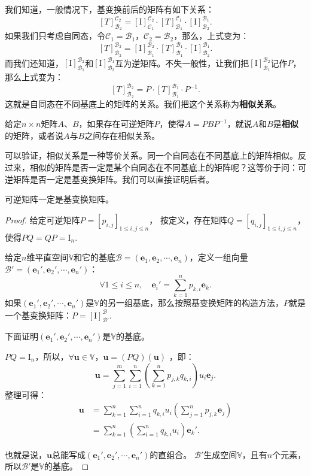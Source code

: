 \documentclass[12pt,UTF8]{ctexbook}
\begin{document}
我们知道，一般情况下，基变换前后的矩阵有如下关系：
$$[T]_{\mathcal{B}_2}^{\mathcal{C}_2} = [\mathrm{I}]_{\mathcal{C}_1}^{\mathcal{C}_2} \cdot [T]_{\mathcal{B}_1}^{\mathcal{C}_1} \cdot [\mathrm{I}]_{\mathcal{B}_2}^{\mathcal{B}_1} .$$
如果我们只考虑自同态，令$\mathcal{C}_1 = \mathcal{B}_1$，$\mathcal{C}_2 = \mathcal{B}_2$，那么，上式变为：
$$[T]_{\mathcal{B}_2}^{\mathcal{B}_2} = [\mathrm{I}]_{\mathcal{B}_1}^{\mathcal{B}_2} \cdot [T]_{\mathcal{B}_1}^{\mathcal{B}_1} \cdot [\mathrm{I}]_{\mathcal{B}_2}^{\mathcal{B}_1} .$$
而我们还知道，$[\mathrm{I}]_{\mathcal{B}_1}^{\mathcal{B}_2}$和$ [\mathrm{I}]_{\mathcal{B}_2}^{\mathcal{B}_1}$互为逆矩阵。不失一般性，让我们把$[\mathrm{I}]_{\mathcal{B}_1}^{\mathcal{B}_2}$记作$P$，那么上式变为：
$$[T]_{\mathcal{B}_2}^{\mathcal{B}_2} = P \cdot [T]_{\mathcal{B}_1}^{\mathcal{B}_1} \cdot P^{-1} .$$
这就是自同态在不同基底上的矩阵的关系。我们把这个关系称为\textbf{相似关系}。

\begin{df}\label{df:5_1}
给定$n\times n$矩阵$A$、$B$，如果存在可逆矩阵$P$，使得$A = PBP^{-1}$，就说$A$和$B$是\textbf{相似}的矩阵，或者说$A$与$B$之间存在相似关系。
\end{df}
可以验证，相似关系是一种等价关系。同一个自同态在不同基底上的矩阵相似。反过来，相似的矩阵是否一定是某个自同态在不同基底上的矩阵呢？这等价于问：可逆矩阵是否一定是基变换矩阵。我们可以直接证明后者。

\begin{pp}\label{pp:5_2}
    可逆矩阵一定是基变换矩阵。
\end{pp}
\begin{proof} %
给定可逆矩阵$P = [p_{i,j}]_{1\leqslant i , j \leqslant n}$，
按定义，存在矩阵$Q = [q_{i,j}]_{1\leqslant i , j \leqslant n}$，
使得$PQ = QP = \mathrm{I}_n$.

给定$n$维平直空间$\mathbb{V}$和它的基底$\mathcal{B} = (\mathbf{e}_1, \mathbf{e}_2, \cdots , \mathbf{e}_n)$，定义一组向量$\mathcal{B}' = (\mathbf{e}_1', \mathbf{e}_2', \cdots , \mathbf{e}_n')$：
$$\forall 1 \leqslant i \leqslant n, \quad \mathbf{e}_i' = \sum_{k=1}^n p_{k,i} \mathbf{e}_k.$$
如果$(\mathbf{e}_1', \mathbf{e}_2', \cdots , \mathbf{e}_n')$是$\mathbb{V}$的另一组基底，那么按照基变换矩阵的构造方法，$P$就是一个基变换矩阵：$P = [\mathrm{I}]_{\mathcal{B}'}^{\mathcal{B}}$.

下面证明$(\mathbf{e}_1', \mathbf{e}_2', \cdots , \mathbf{e}_n')$是$\mathbb{V}$的基底。

$PQ = \mathrm{I}_n$，所以，$\forall \mathbf{u} \in \mathbb{V}$，$\mathbf{u} = (PQ)(\mathbf{u})$ ，即：
$$\mathbf{u} = \sum_{j=1}^m \sum_{i=1}^n \left(\sum_{k=1}^n p_{j,k} q_{k, i} \right) u_i \mathbf{e}_j.$$
整理可得：
\begin{align*}
    \mathbf{u} &= \sum_{k=1}^n \sum_{i=1}^n q_{k, i}  u_i \left( \sum_{j=1}^n p_{j,k} \mathbf{e}_j\right)  \\
    &= \sum_{k=1}^n \left(\sum_{i=1}^n q_{k, i}  u_i\right) \mathbf{e}_k'. 
\end{align*}

也就是说，$\mathbf{u}$总能写成$(\mathbf{e}_1', \mathbf{e}_2', \cdots , \mathbf{e}_n')$的直组合。
$\mathcal{B}'$生成空间$\mathbb{V}$，且有$n$个元素，所以$\mathcal{B}'$是$\mathbb{V}$的基底。
\end{proof}
\end{document}
